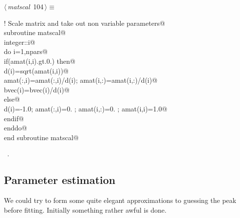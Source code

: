 \documentclass[10pt,a4paper,notitlepage]{article}
\begin{document}
\begin{flushleft} \small
\begin{minipage}{\linewidth}\label{scrap128}\raggedright\small
{} $\langle\,${\it matscal}\nobreak\ {\footnotesize {104}}$\,\rangle\equiv$
\vspace{-1ex}
\begin{list}{}{} \item
\mbox{}\verb@! Scale matrix and take out non variable parameters@\\
\mbox{}\verb@      subroutine matscal@\\
\mbox{}\verb@      integer::i@\\
\mbox{}\verb@      do i=1,npars@\\
\mbox{}\verb@       if(amat(i,i).gt.0.) then@\\
\mbox{}\verb@        d(i)=sqrt(amat(i,i))@\\
\mbox{}\verb@        amat(:,i)=amat(:,i)/d(i); amat(i,:)=amat(i,:)/d(i)@\\
\mbox{}\verb@        bvec(i)=bvec(i)/d(i)@\\
\mbox{}\verb@       else@\\
\mbox{}\verb@        d(i)=-1.0; amat(:,i)=0. ; amat(i,:)=0. ; amat(i,i)=1.0@\\
\mbox{}\verb@       endif@\\
\mbox{}\verb@      enddo@\\
\mbox{}\verb@      end subroutine matscal@\\
\mbox{}\verb@@{\NWsep}
\end{list}
\vspace{-1.5ex}
\footnotesize
\begin{list}{}{\setlength{\itemsep}{-\parsep}\setlength{\itemindent}{-\leftmargin}}
\item \NWtxtMacroRefIn\ .

\item{}
\end{list}
\end{minipage}\vspace{4ex}
\end{flushleft}
\subsection{Parameter estimation}

We could try to form some quite elegant approximations to guessing the 
peak before fitting. Initially something rather awful is done.
\end{document}
